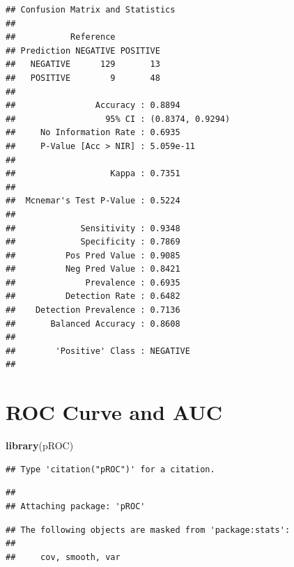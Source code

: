 \documentclass[
]{article}
\newenvironment{Shaded}{\begin{snugshade}}{\end{snugshade}}
\newcommand{\FunctionTok}[1]{\textcolor[rgb]{0.13,0.29,0.53}{\textbf{#1}}}
\newcommand{\NormalTok}[1]{#1}
\newcommand{\OtherTok}[1]{\textcolor[rgb]{0.56,0.35,0.01}{#1}}
\newcommand{\SpecialCharTok}[1]{\textcolor[rgb]{0.81,0.36,0.00}{\textbf{#1}}}
\begin{document}
\begin{verbatim}
## Confusion Matrix and Statistics
## 
##           Reference
## Prediction NEGATIVE POSITIVE
##   NEGATIVE      129       13
##   POSITIVE        9       48
##                                           
##                Accuracy : 0.8894          
##                  95% CI : (0.8374, 0.9294)
##     No Information Rate : 0.6935          
##     P-Value [Acc > NIR] : 5.059e-11       
##                                           
##                   Kappa : 0.7351          
##                                           
##  Mcnemar's Test P-Value : 0.5224          
##                                           
##             Sensitivity : 0.9348          
##             Specificity : 0.7869          
##          Pos Pred Value : 0.9085          
##          Neg Pred Value : 0.8421          
##              Prevalence : 0.6935          
##          Detection Rate : 0.6482          
##    Detection Prevalence : 0.7136          
##       Balanced Accuracy : 0.8608          
##                                           
##        'Positive' Class : NEGATIVE        
## 
\end{verbatim}

\section{ROC Curve and AUC}\label{roc-curve-and-auc}

\begin{Shaded}
\begin{Highlighting}[]
\FunctionTok{library}\NormalTok{(pROC)}
\end{Highlighting}
\end{Shaded}

\begin{verbatim}
## Type 'citation("pROC")' for a citation.
\end{verbatim}

\begin{verbatim}
## 
## Attaching package: 'pROC'
\end{verbatim}

\begin{verbatim}
## The following objects are masked from 'package:stats':
## 
##     cov, smooth, var
\end{verbatim}

\begin{Shaded}
\end{Shaded}
\end{document}
